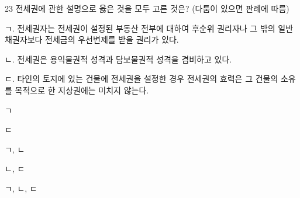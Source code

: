 \begin{question}{23}
전세권에 관한 설명으로 옳은 것을 모두 고른 것은? (다툼이 있으면 판례에 따름)
\begin{framedtext}
ㄱ. 전세권자는 전세권이 설정된 부동산 전부에 대하여 후순위 권리자나 그 밖의 일반채권자보다 전세금의 우선변제를 받을 권리가 있다. \par
ㄴ. 전세권은 용익물권적 성격과 담보물권적 성격을 겸비하고 있다. \par
ㄷ. 타인의 토지에 있는 건물에 전세권을 설정한 경우 전세권의 효력은 그 건물의 소유를 목적으로 한 지상권에는 미치지 않는다. \par
\end{framedtext}
\begin{choices}
  \item ㄱ
  \item ㄷ
  \item ㄱ, ㄴ
  \item ㄴ, ㄷ
  \item ㄱ, ㄴ, ㄷ
\end{choices}
\end{question}
